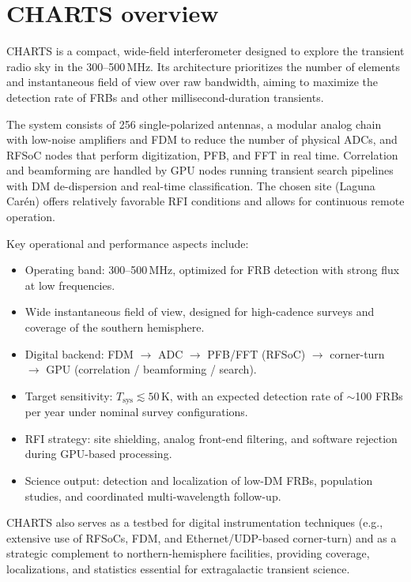 
\chapter{CHARTS overview}
CHARTS is a compact, wide-field interferometer designed to explore the transient radio sky in the 300--500\,MHz. Its architecture prioritizes the number of elements and instantaneous field of view over raw bandwidth, aiming to maximize the detection rate of FRBs and other millisecond-duration transients.

The system consists of 256 single-polarized antennas, a modular analog chain with low-noise amplifiers and FDM to reduce the number of physical ADCs, and RFSoC nodes that perform digitization, PFB, and FFT in real time. Correlation and beamforming are handled by GPU nodes running transient search pipelines with DM de-dispersion and real-time classification. The chosen site (Laguna Carén) offers relatively favorable RFI conditions and allows for continuous remote operation.

Key operational and performance aspects include:
\begin{itemize}
  \item Operating band: 300--500\,MHz, optimized for FRB detection with strong flux at low frequencies.
  \item Wide instantaneous field of view, designed for high-cadence surveys and coverage of the southern hemisphere.
  \item Digital backend: FDM $\rightarrow$ ADC $\rightarrow$ PFB/FFT (RFSoC) $\rightarrow$ corner-turn $\rightarrow$ GPU (correlation / beamforming / search).
  \item Target sensitivity: $T_{\text{sys}} \lesssim 50\,$K, with an expected detection rate of $\sim$100 FRBs per year under nominal survey configurations.
  \item RFI strategy: site shielding, analog front-end filtering, and software rejection during GPU-based processing.
  \item Science output: detection and localization of low-DM FRBs, population studies, and coordinated multi-wavelength follow-up.
\end{itemize}

CHARTS also serves as a testbed for digital instrumentation techniques (e.g., extensive use of RFSoCs, FDM, and Ethernet/UDP-based corner-turn) and as a strategic complement to northern-hemisphere facilities, providing coverage, localizations, and statistics essential for extragalactic transient science. 

